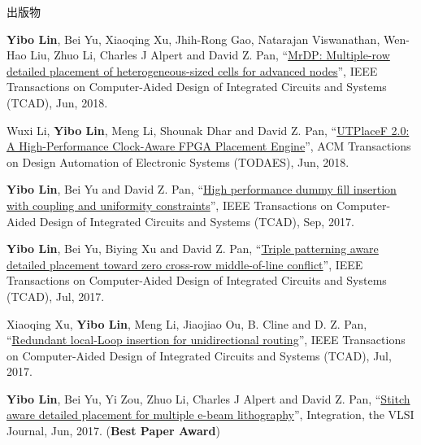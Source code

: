 \begin{rSection}{出版物}
\begin{description}[font=\normalfont]
{}
            

\item[{[J9]}]{
        \textbf{Yibo Lin}, Bei Yu, Xiaoqing Xu, Jhih-Rong Gao, Natarajan Viswanathan, Wen-Hao Liu, Zhuo Li, Charles J Alpert and David Z. Pan, 
    ``\href{https://doi.org/10.1109/TCAD.2017.2748025}{MrDP: Multiple-row detailed placement of heterogeneous-sized cells for advanced nodes}'', 
    IEEE Transactions on Computer-Aided Design of Integrated Circuits and Systems (TCAD), Jun, 2018.
    
}
            

\item[{[J8]}]{
        Wuxi Li, \textbf{Yibo Lin}, Meng Li, Shounak Dhar and David Z. Pan, 
    ``\href{https://doi.org/10.1145/3174849}{UTPlaceF 2.0: A High-Performance Clock-Aware FPGA Placement Engine}'', 
    ACM Transactions on Design Automation of Electronic Systems (TODAES), Jun, 2018.
    
}
            

\item[{[J7]}]{
        \textbf{Yibo Lin}, Bei Yu and David Z. Pan, 
    ``\href{http://dx.doi.org/10.1109/TCAD.2016.2638452}{High performance dummy fill insertion with coupling and uniformity constraints}'', 
    IEEE Transactions on Computer-Aided Design of Integrated Circuits and Systems (TCAD), Sep, 2017.
    
}
            

\item[{[J6]}]{
        \textbf{Yibo Lin}, Bei Yu, Biying Xu and David Z. Pan, 
    ``\href{http://dx.doi.org/10.1109/TCAD.2017.2648843}{Triple patterning aware detailed placement toward zero cross-row middle-of-line conflict}'', 
    IEEE Transactions on Computer-Aided Design of Integrated Circuits and Systems (TCAD), Jul, 2017.
    
}
            

\item[{[J5]}]{
        Xiaoqing Xu, \textbf{Yibo Lin}, Meng Li, Jiaojiao Ou,  B. Cline  and  D. Z. Pan, 
    ``\href{http://dx.doi.org/10.1109/TCAD.2017.2651811}{Redundant local-Loop insertion for unidirectional routing}'', 
    IEEE Transactions on Computer-Aided Design of Integrated Circuits and Systems (TCAD), Jul, 2017.
    
}
            

\item[{[J4]}]{
        \textbf{Yibo Lin}, Bei Yu, Yi Zou, Zhuo Li, Charles J Alpert and David Z. Pan, 
    ``\href{http://dx.doi.org/10.1016/j.vlsi.2017.02.004}{Stitch aware detailed placement for multiple e-beam lithography}'', 
    Integration, the VLSI Journal, Jun, 2017.
    (\textbf{Best Paper Award})
}
            


\end{description}
\end{rSection}
